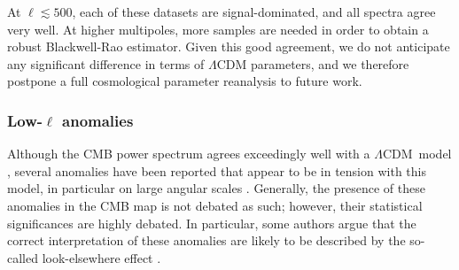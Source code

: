 \documentclass[twocolumn]{../../common/aa}
\def\WMAPnine{\emph{WMAP9}}
\def\planck{\emph{Planck}}
\def\LCDM{$\Lambda$CDM}
\newcommand{\bp}{\textsc{BeyondPlanck}}
\newcommand{\cosmoglobe}{\textsc{Cosmoglobe}}
\begin{document}

At $\ell\lesssim500$, each of these datasets are signal-dominated, and all spectra agree very well. At higher multipoles, more samples are needed in order to obtain a robust Blackwell-Rao estimator. %
Given this good agreement, we do not anticipate any significant difference in terms of $\Lambda$CDM parameters, and we therefore postpone a full cosmological parameter reanalysis to future work. 



\subsubsection{Low-$\ell$ anomalies}
\label{sec:anomalies}

Although the CMB power spectrum agrees exceedingly well with a \LCDM\ model \citep[e.g.,][]{hinshaw2012,planck2016-l06,bp12}, several anomalies have been reported that appear to be in tension with this model, in particular on large angular scales \citep[e.g.,][and references therein]{planck2016-l07}. Generally, the presence of these anomalies in the CMB map is not debated as such; however, their statistical significances are highly debated. In particular, some authors argue that the correct interpretation of these anomalies are likely to be described by the so-called look-elsewhere effect \citep[e.g.,][]{bennett2010}. %
\end{document}
